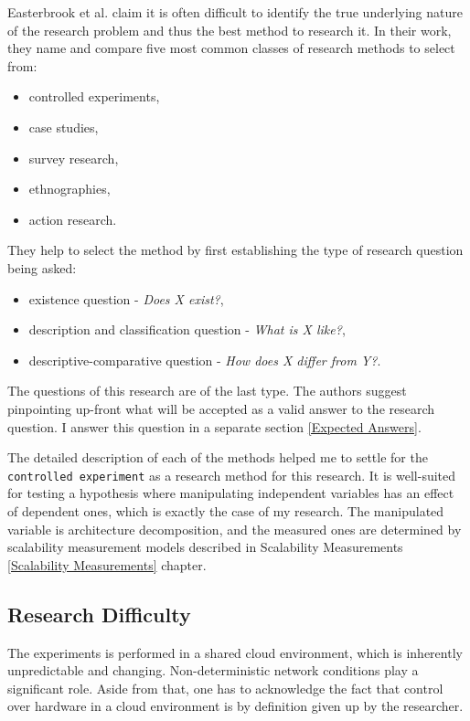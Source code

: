 \documentclass{uvamscse}
\begin{document}
Easterbrook et al. \cite{EastBr} claim it is often difficult to identify the true underlying nature of the research problem and thus the best method to research it. In their work, they name and compare five most common classes of research methods to select from:
\begin{itemize}
  \item controlled experiments,
  \item case studies,
  \item survey research,
  \item ethnographies,
  \item action research.
\end{itemize}
They help to select the method by first establishing the type of research question being asked:
\begin{itemize}
  \item existence question - \textit{Does X exist?},
  \item description and classification question - \textit{What is X like?},
  \item descriptive-comparative question - \textit{How does X differ from Y?}.
\end{itemize}
The questions of this research are of the last type. The authors \cite{EastBr} suggest pinpointing up-front what will be accepted as a valid answer to the research question. I answer this question in a separate section \ref{Expected Answers}.

The detailed description of each of the methods helped me to settle for the \texttt{controlled experiment} as a research method for this research. It is well-suited for testing a hypothesis where manipulating independent variables has an effect of dependent ones, which is exactly the case of my research. The manipulated variable is architecture decomposition, and the measured ones are determined by scalability measurement models described in Scalability Measurements \ref{Scalability Measurements} chapter.

\subsection{Research Difficulty}
The experiments is performed in a shared cloud environment, which is inherently unpredictable and changing. Non-deterministic network conditions play a significant role. Aside from that, one has to acknowledge the fact that control over hardware in a cloud environment is by definition given up by the researcher.
\end{document}
